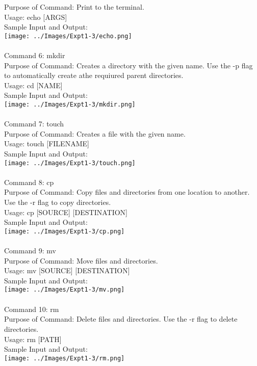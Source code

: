 \documentclass[10pt,a4paper]{report}
\begin{document}
Purpose of Command: Print to the terminal.\\
Usage: echo [ARGS]\\
Sample Input and Output: \\
\texttt{[image: ../Images/Expt1-3/echo.png]}\\
\\
Command 6: mkdir\\
Purpose of Command: Creates a directory with the given name. Use the -p flag to automatically create athe requiured parent directories.\\
Usage: cd [NAME]\\
Sample Input and Output: \\
\texttt{[image: ../Images/Expt1-3/mkdir.png]}\\
\pagebreak
\\
Command 7: touch\\
Purpose of Command: Creates a file with the given name.\\
Usage: touch [FILENAME]\\
Sample Input and Output: \\
\texttt{[image: ../Images/Expt1-3/touch.png]}\\
\\
Command 8: cp\\
Purpose of Command: Copy files and directories from one location to another. Use the -r flag to copy directories.\\
Usage: cp [SOURCE] [DESTINATION]\\
Sample Input and Output: \\
\texttt{[image: ../Images/Expt1-3/cp.png]}\\
\\
Command 9: mv\\
Purpose of Command: Move files and directories.\\
Usage: mv [SOURCE] [DESTINATION]\\
Sample Input and Output: \\
\texttt{[image: ../Images/Expt1-3/mv.png]}\\
\pagebreak
\\
Command 10: rm\\
Purpose of Command: Delete files and directories. Use the -r flag to delete directories.\\
Usage: rm [PATH]\\
Sample Input and Output: \\
\texttt{[image: ../Images/Expt1-3/rm.png]}\\
\end{document}
